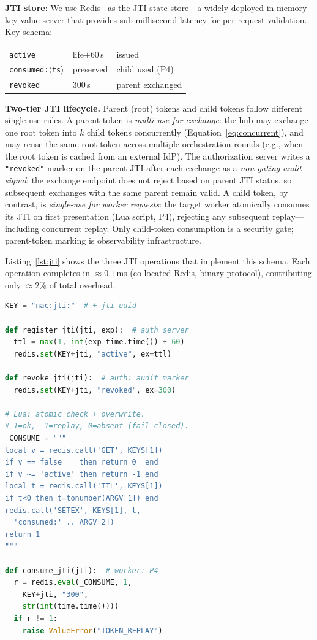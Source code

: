 \documentclass[journal]{IEEEtran}
\theoremstyle{definition}
\begin{document}
\textbf{JTI store}: We use Redis~\cite{redis} as the JTI state
store---a widely deployed in-memory key-value server that provides
sub-millisecond latency for per-request validation. Key schema:

\smallskip
\noindent
{\scriptsize
\begin{tabular}{@{}lll@{}}
\texttt{active} & life$+$60\,s & issued \\
\texttt{consumed:$\langle$ts$\rangle$} & preserved & child used (P4) \\
\texttt{revoked} & 300\,s & parent exchanged \\
\end{tabular}}
\smallskip

\textbf{Two-tier JTI lifecycle.}  Parent (root) tokens and child tokens follow
different single-use rules.  A parent token is \textit{multi-use for exchange}:
the hub may exchange one root token into $k$ child tokens concurrently
(Equation~\ref{eq:concurrent}), and may reuse the same root token across
multiple orchestration rounds (e.g., when the root token is cached from an
external IdP).  The authorization server writes a \texttt{"revoked"} marker on
the parent JTI after each exchange as a \textit{non-gating audit signal}; the
exchange endpoint does not reject based on parent JTI status, so subsequent
exchanges with the same parent remain valid.  A child token, by contrast, is
\textit{single-use for worker requests}: the target worker atomically consumes
its JTI on first presentation (Lua script, P4), rejecting any subsequent
replay---including concurrent replay.  Only child-token consumption is a
security gate; parent-token marking is observability infrastructure.

Listing~\ref{lst:jti} shows the three JTI operations that implement this
schema. Each operation completes in $\approx 0.1$\,ms (co-located Redis,
binary protocol), contributing only $\approx 2\%$ of total overhead.

\begin{lstlisting}[language=Python, label=lst:jti,
  caption={JTI store operations ($\approx$0.1\,ms/op).
  The Lua script eliminates TOCTOU races.}]
KEY = "nac:jti:"  # + jti uuid

def register_jti(jti, exp):  # auth server
  ttl = max(1, int(exp-time.time()) + 60)
  redis.set(KEY+jti, "active", ex=ttl)

def revoke_jti(jti):  # auth: audit marker
  redis.set(KEY+jti, "revoked", ex=300)

# Lua: atomic check + overwrite.
# 1=ok, -1=replay, 0=absent (fail-closed).
_CONSUME = """
local v = redis.call('GET', KEYS[1])
if v == false    then return 0  end
if v ~= 'active' then return -1 end
local t = redis.call('TTL', KEYS[1])
if t<0 then t=tonumber(ARGV[1]) end
redis.call('SETEX', KEYS[1], t,
  'consumed:' .. ARGV[2])
return 1
"""

def consume_jti(jti):  # worker: P4
  r = redis.eval(_CONSUME, 1,
    KEY+jti, "300",
    str(int(time.time())))
  if r != 1:
    raise ValueError("TOKEN_REPLAY")
\end{lstlisting}
\end{document}
